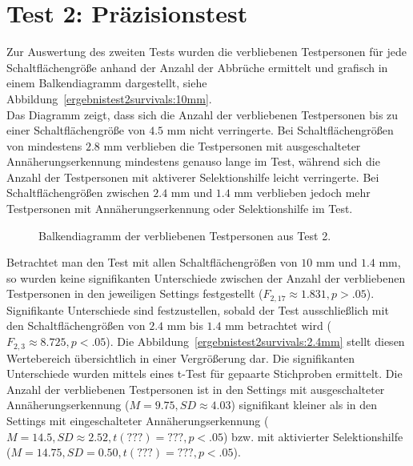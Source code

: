 \documentclass[12pt,numbers=noenddot,parskip,bibliography=totocnumbered,listof=totocnumbered]{scrreprt}
\begin{document}
\section{Test 2: Präzisionstest}
Zur Auswertung des zweiten Tests wurden die verbliebenen Testpersonen für jede Schaltflächengröße anhand der Anzahl der Abbrüche ermittelt und grafisch in einem Balkendiagramm dargestellt, siehe Abbildung~\ref{ergebnistest2survivals:10mm}.\\
Das Diagramm zeigt, dass sich die Anzahl der verbliebenen Testpersonen bis zu einer Schaltflächengröße von $4.5$ mm nicht verringerte. Bei Schaltflächengrößen von mindestens $2.8$ mm verblieben die Testpersonen mit ausgeschalteter Annäherungserkennung mindestens genauso lange im Test, während sich die Anzahl der Testpersonen mit aktiverer Selektionshilfe leicht verringerte. Bei Schaltflächengrößen zwischen $2.4$ mm und $1.4$ mm verblieben jedoch mehr Testpersonen mit Annäherungserkennung oder Selektionshilfe im Test.\\
\begin{figure}
\centering
{}
\vfill
{}
\caption{Balkendiagramm der verbliebenen Testpersonen aus Test 2.}
\label{ergebnistest2survivals}
\end{figure}
Betrachtet man den Test mit allen Schaltflächengrößen von $10$ mm und $1.4$ mm, so wurden keine signifikanten Unterschiede zwischen der Anzahl der verbliebenen Testpersonen in den jeweiligen Settings festgestellt ($F_{2,17}\approx 1.831, p > .05$). Signifikante Unterschiede sind festzustellen, sobald der Test ausschließlich mit den Schaltflächengrößen von $2.4$ mm bis $1.4$ mm betrachtet wird ($F_{2,3}\approx 8.725, p < .05$). Die Abbildung~\ref{ergebnistest2survivals:2.4mm} stellt diesen Wertebereich übersichtlich in einer Vergrößerung dar. Die signifikanten Unterschiede wurden mittels eines t-Test für gepaarte Stichproben ermittelt. Die Anzahl der verbliebenen Testpersonen ist in den Settings mit ausgeschalteter Annäherungserkennung ($M = 9.75, SD\approx 4.03$) signifikant kleiner als in den Settings mit eingeschalteter Annäherungserkennung ($M = 14.5, SD\approx 2.52, t(???) =??? , p < .05$) bzw. mit aktivierter Selektionshilfe ($M = 14.75, SD = 0.50, t(???) = ??? , p < .05$).
\end{document}
